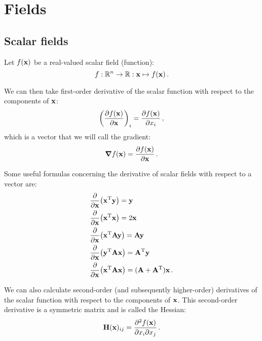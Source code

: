 \section{Fields}
    \subsection{Scalar fields}
        Let $f(\vb{x})$ be a real-valued scalar field (function):
        \begin{equation}
            f: \mathbb{R}^n \rightarrow \mathbb{R}: \vb{x} \mapsto f(\vb{x}) \thinspace .
        \end{equation}

        We can then take first-order derivative of the scalar function with respect to the components of $\vb{x}$:
        \begin{equation}
            \qty(\pdv{f(\vb{x})}{\vb{x}})_i = \pdv{f(\vb{x})}{x_i} \thinspace ,
        \end{equation}
        which is a vector that we will call the gradient:
        \begin{equation}
            \grad{f(\vb{x})} = \pdv{f(\vb{x})}{\vb{x}} \thinspace .
        \end{equation}

        Some useful formulas concerning the derivative of scalar fields with respect to a vector are:
        \begin{align}
            & \pdv{\vb{x}} (\vb{x}^\text{T} \vb{y}) = \vb{y} \\
            & \pdv{\vb{x}} (\vb{x}^\text{T} \vb{x}) = 2 \vb{x} \\
            & \pdv{\vb{x}} (\vb{x}^\text{T} \vb{A} \vb{y}) = \vb{A} \vb{y} \\
            & \pdv{\vb{x}} (\vb{y}^\text{T} \vb{A} \vb{x}) = \vb{A}^\text{T} \vb{y} \\
            & \pdv{\vb{x}} (\vb{x}^\text{T} \vb{A} \vb{x}) = (\vb{A} + \vb{A}^\text{T}) \vb{x} \thinspace .
        \end{align}

        We can also calculate second-order (and subsequently higher-order) derivatives of the scalar function with respect to the components of $\vb{x}$. This second-order derivative is a symmetric matrix and is called the Hessian:
        \begin{equation}
            \vb{H}(\vb{x})_{ij} = \pdv{f(\vb{x})}{x_i}{x_j} \thinspace .
        \end{equation}

